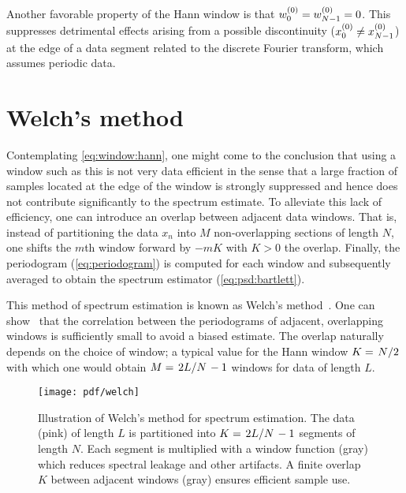 Another favorable property of the Hann window is that $w_0^{(0)} = w_{N-1}^{(0)} = 0$.
This suppresses detrimental effects arising from a possible discontinuity ($x_0^{(0)}\neq x_{N-1}^{(0)}$) at the edge of a data segment related to the discrete Fourier transform, which assumes periodic data.

\section{Welch's method}\label{sec:speck:theory:welch}
Contemplating \cref{eq:window:hann}, one might come to the conclusion that using a window such as this is not very data efficient in the sense that a large fraction of samples located at the edge of the window is strongly suppressed and hence does not contribute significantly to the spectrum estimate.
To alleviate this lack of efficiency, one can introduce an overlap between adjacent data windows.
That is, instead of partitioning the data $x_n$ into $M$ non-overlapping sections of length $N$, one shifts the $m$th window forward by $-mK$ with $K>0$ the overlap.
Finally, the periodogram (\cref{eq:periodogram}) is computed for each window and subsequently averaged to obtain the spectrum estimator (\cref{eq:psd:bartlett}).

This method of spectrum estimation is known as Welch's method~\cite{Welch1967}.
One can show~\cite{Welch1967} that the correlation between the periodograms of adjacent, overlapping windows is sufficiently small to avoid a biased estimate.
The overlap naturally depends on the choice of window; a typical value for the Hann window $K = \flatfrac{N}{2}$ with which one would obtain $M = \flatfrac{2L}{N} - 1$ windows for data of length $L$.
\begin{figure}[tphb]
    \texttt{[image: pdf/welch]}
    \caption{
        Illustration of Welch's method for spectrum estimation.
        The data (pink) of length $L$ is partitioned into $K = \flatfrac{2L}{N} - 1$ segments of length $N$.
        Each segment is multiplied with a window function (gray) which reduces spectral leakage and other artifacts.
        A finite overlap $K$ between adjacent windows (gray) ensures efficient sample use.
    }
    \label{fig:welch}
\end{figure}

